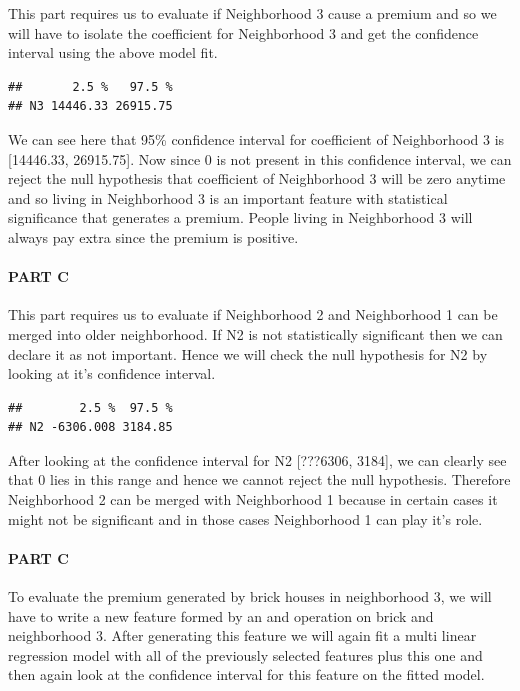\documentclass[
]{article}
\begin{document}
This part requires us to evaluate if Neighborhood 3 cause a premium and
so we will have to isolate the coefficient for Neighborhood 3 and get
the confidence interval using the above model fit.

\begin{verbatim}
##       2.5 %   97.5 %
## N3 14446.33 26915.75
\end{verbatim}

We can see here that 95\% confidence interval for coefficient of
Neighborhood 3 is {[}14446.33, 26915.75{]}. Now since 0 is not present
in this confidence interval, we can reject the null hypothesis that
coefficient of Neighborhood 3 will be zero anytime and so living in
Neighborhood 3 is an important feature with statistical significance
that generates a premium. People living in Neighborhood 3 will always
pay extra since the premium is positive.

\hypertarget{part-c-6}{%
\paragraph{\texorpdfstring{{PART C}}{PART C}}\label{part-c-6}}

This part requires us to evaluate if Neighborhood 2 and Neighborhood 1
can be merged into older neighborhood. If N2 is not statistically
significant then we can declare it as not important. Hence we will check
the null hypothesis for N2 by looking at it's confidence interval.

\begin{verbatim}
##        2.5 %  97.5 %
## N2 -6306.008 3184.85
\end{verbatim}

After looking at the confidence interval for N2 {[}???6306, 3184{]}, we
can clearly see that 0 lies in this range and hence we cannot reject the
null hypothesis. Therefore Neighborhood 2 can be merged with
Neighborhood 1 because in certain cases it might not be significant and
in those cases Neighborhood 1 can play it's role.

\hypertarget{part-c-7}{%
\paragraph{\texorpdfstring{{PART C}}{PART C}}\label{part-c-7}}

To evaluate the premium generated by brick houses in neighborhood 3, we
will have to write a new feature formed by an and operation on brick and
neighborhood 3. After generating this feature we will again fit a multi
linear regression model with all of the previously selected features
plus this one and then again look at the confidence interval for this
feature on the fitted model.
\end{document}
